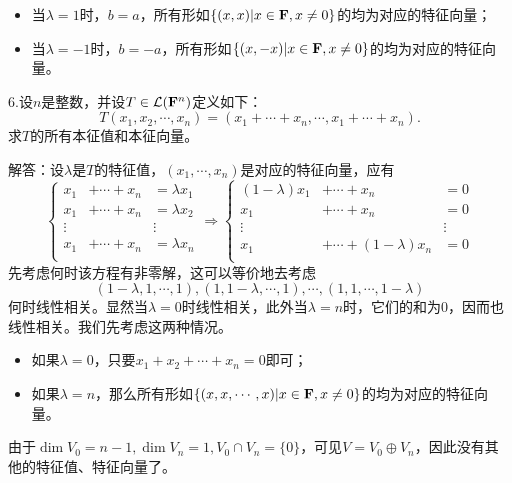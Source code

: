 \documentclass[hyperref,]{ctexart}
\providecommand{\tightlist}{%
  \setlength{\itemsep}{0pt}\setlength{\parskip}{0pt}}
\begin{document}
\begin{itemize}
\tightlist
\item
  当\(\lambda=1\)时，\(b=a\)，所有形如\(\{(x,x)|x\in \mathbf{F},x\ne 0\}\)的均为对应的特征向量；
\item
  当\(\lambda=-1\)时，\(b=-a\)，所有形如\(\{(x,-x)|x\in \mathbf{F},x\ne 0\}\)的均为对应的特征向量。
\end{itemize}

\bigskip

\noindent{}6.设\(n\)是整数，并设\(T\in\mathcal{L}(\mathbf{F}^n)\)定义如下：
\[T(x_1,x_2,\cdots,x_n)=(x_1+\cdots+x_n,\cdots,x_1+\cdots+x_n).\]
求\(T\)的所有本征值和本征向量。

\smallskip

\noindent{}解答：设\(\lambda\)是\(T\)的特征值，\((x_1,\cdots,x_n)\)是对应的特征向量，应有
\[\left\{
\begin{aligned}
x_1&+\cdots+x_n &= \lambda x_1\\
x_1&+\cdots+x_n &= \lambda x_2\\
\vdots&&\vdots\\
x_1&+\cdots+x_n &= \lambda x_n\\
\end{aligned}\right.
\Rightarrow
\left\{
\begin{aligned}
(1-\lambda)x_1&+\cdots+x_n &= 0\\
x_1&+\cdots+x_n &= 0\\
\vdots&&\vdots\\
x_1&+\cdots+(1-\lambda)x_n &= 0\\
\end{aligned}\right.
\] 先考虑何时该方程有非零解，这可以等价地去考虑
\[(1-\lambda,1,\cdots,1), (1,1-\lambda,\cdots,1),\cdots,(1,1,\cdots,1-\lambda)\]
何时线性相关。显然当\(\lambda=0\)时线性相关，此外当\(\lambda=n\)时，它们的和为\(0\)，因而也线性相关。我们先考虑这两种情况。

\begin{itemize}
\tightlist
\item
  如果\(\lambda=0\)，只要\(x_1+x_2+\cdots+x_n=0\)即可；
\item
  如果\(\lambda=n\)，那么所有形如\(\{(x,x,\cdots,x)|x\in \mathbf{F},x\ne 0\}\)的均为对应的特征向量。
\end{itemize}

由于\(\dim V_0=n-1,\dim V_n=1,V_0\cap V_n=\{0\}\)，可见\(V=V_0\oplus V_n\)，因此没有其他的特征值、特征向量了。
\end{document}

